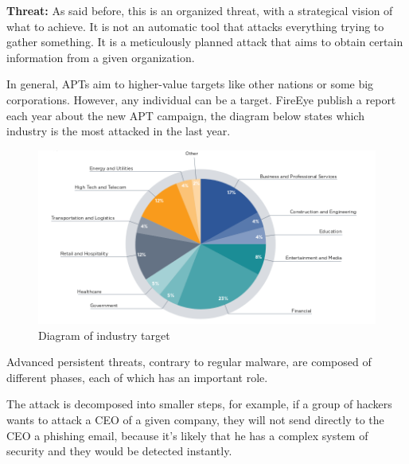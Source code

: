 \textbf{Threat:} As said before, this is an organized threat, with a strategical vision of what to achieve. It is not an automatic tool that attacks everything trying to gather something. It is a meticulously planned attack that aims to obtain certain information from a given organization. 

In general, APTs aim to higher-value targets like other nations or some big corporations. However, any individual can be a target. FireEye publish a report each year about the new APT campaign, the diagram below states which industry is the most attacked in the last year.\\

\begin{figure}[!h]
	\centering
	\includegraphics[width=1.0\columnwidth]{graph}
	\caption{Diagram of industry target}
\end{figure}





Advanced persistent threats, contrary to regular malware, are composed of different phases, each of which has an important role. 

The attack is decomposed into smaller steps, for example, if a group of hackers wants to attack a CEO of a given company, they will not send directly to the CEO a phishing email, because it's likely that he has a complex system of security and they would be detected instantly. 

